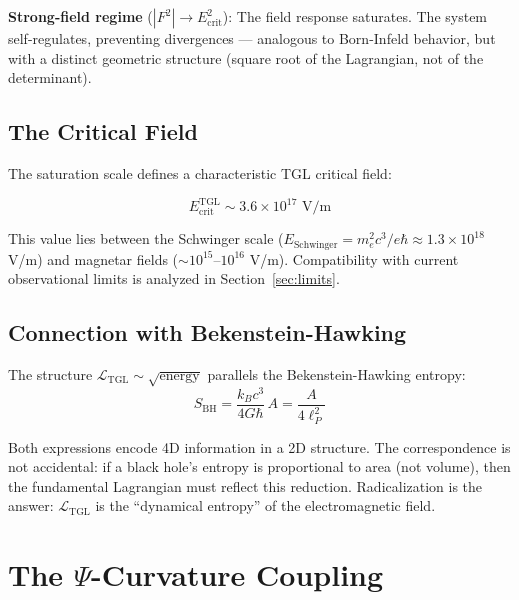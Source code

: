 \documentclass[12pt,a4paper,twoside]{article}
\newcommand{\Ltgl}{\mathcal{L}_{\text{TGL}}}
\newcommand{\Psifield}{\Psi}
\newcommand{\Ecrit}{E_{\text{crit}}}
\begin{document}
\medskip
\noindent\textbf{Strong-field regime} ($|F^2| \to \Ecrit^2$): The field response saturates. The system self-regulates, preventing divergences --- analogous to Born-Infeld behavior, but with a distinct geometric structure (square root of the Lagrangian, not of the determinant).

\subsection{The Critical Field}

The saturation scale defines a characteristic TGL critical field:

\begin{equation}
\Ecrit^{\text{TGL}} \sim 3.6 \times 10^{17} \text{ V/m}
\label{eq:ecrit}
\end{equation}

\noindent This value lies between the Schwinger scale ($E_{\text{Schwinger}} = m_e^2 c^3 / e\hbar \approx 1.3 \times 10^{18}$ V/m) and magnetar fields ($\sim 10^{15}$--$10^{16}$ V/m). Compatibility with current observational limits is analyzed in Section~\ref{sec:limits}.


\subsection{Connection with Bekenstein-Hawking}

The structure $\Ltgl \sim \sqrt{\text{energy}}$ parallels the Bekenstein-Hawking entropy:
\begin{equation}
S_{\text{BH}} = \frac{k_B c^3}{4G\hbar}\, A = \frac{A}{4\ell_P^2}
\label{eq:bekenstein}
\end{equation}

Both expressions encode 4D information in a 2D structure. The correspondence is not accidental: if a black hole's entropy is proportional to area (not volume), then the fundamental Lagrangian must reflect this reduction. Radicalization is the answer: $\Ltgl$ is the ``dynamical entropy'' of the electromagnetic field.


\section{The $\Psifield$-Curvature Coupling}
\end{document}
